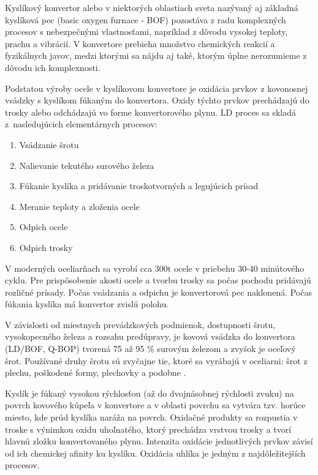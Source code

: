 \documentclass[]{tukediphc}
\begin{document}
Kyslíkový konvertor alebo v niektorých oblastiach sveta nazývaný aj základná kyslíková pec (basic oxygen furnace - BOF) pozostáva z radu komplexných procesov s nebezpečnými vlastnosťami, napríklad z dôvodu vysokej teploty, prachu a vibrácií. V konvertore prebieha  množstvo chemických reakcií a fyzikálnych javov, medzi ktorými sa nájdu aj také, ktorým úplne nerozumieme z dôvodu ich komplexnosti.

Podstatou výroby ocele v kyslíkovom konvertore je oxidácia prvkov z kovonosnej vsádzky s kyslíkom fúkaným do konvertora. Oxidy týchto prvkov prechádzajú do trosky alebo odchádzajú vo forme konvertorového plynu. LD proces sa skladá z~nasledujúcich elementárnych procesov:

\begin{enumerate}
	\item Vsádzanie šrotu
	\item Nalievanie tekutého surového železa
	\item Fúkanie kyslíka a pridávanie troskotvorných a legujúcich prísad
	\item Meranie teploty a zloženia ocele
	\item Odpich ocele
	\item Odpich trosky
\end{enumerate}

V moderných oceliarňach sa vyrobí cca 300t ocele v priebehu 30-40 minútového cyklu. Pre prispôsobenie akosti ocele a tvorbu trosky sa počas pochodu pridávajú rozličné prísady. Počas vsádzania a odpichu je konvertorová pec naklonená. Počas fúkania kyslíka má konvertor zvislú polohu.

V závislosti od miestnych prevádzkových podmienok, dostupnosti šrotu, vysokopecného železa a rozsahu predúpravy, je kovová vsádzka do konvertora (LD/BOF, Q-BOP) tvorená 75 až 95 \% surovým železom a zvyšok je oceľový šrot. Používané druhy šrotu sú zvyčajne tie, ktoré sa vyrábajú v oceliarni: šrot z plechu, poškodené formy, plechovky a podobne \cite{Turkdogan1996}.

Kyslík je fúkaný vysokou rýchlosťou (až do dvojnásobnej rýchlosti zvuku) na povrch kovového kúpeľa v konvertore a v oblasti povrchu sa vytvára tzv. horúce miesto, kde prúd kyslíka naráža na povrch. Oxidačné produkty sa rozpustia v troske s výnimkou oxidu uhoľnatého, ktorý prechádza vrstvou trosky a tvorí hlavnú zložku konvertovaného plynu. Intenzita oxidácie jednotlivých prvkov závisí od ich chemickej afinity ku kyslíku. Oxidácia uhlíka je jedným z najdôležitejších procesov.
\end{document}
